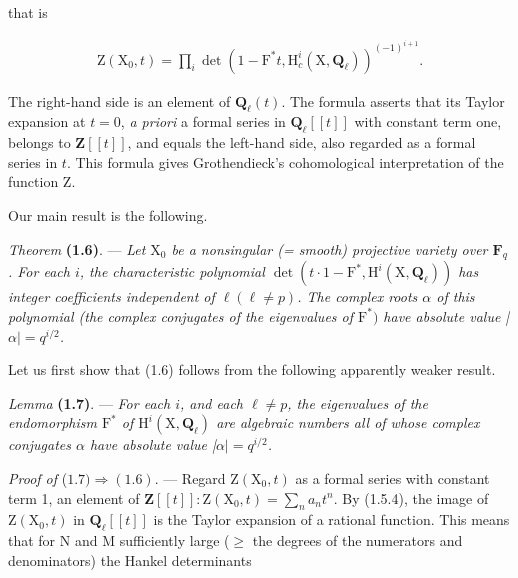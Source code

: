 \documentclass[10pt,leqno]{article}
\begin{document}
\noindent that is\par

\begin{equation*}\begin{gathered}\mathrm{Z}(\mathrm{X}_{0},t) = \prod _{i} \operatorname{det}(1- \mathrm{F}^{*}t, \mathrm{H}_{c}^{i}(\mathrm{X},\mathbf{Q}_{\ell }))^{(- 1)^{i+1}}.\end{gathered}\tag{1.5.4}\end{equation*}

\noindent The right-hand side is an element of \(\mathbf{Q}_{\ell }(t)\). The formula asserts that its Taylor expansion at \(t=0\), \emph{a priori} a formal series in \(\mathbf{Q}_{\ell }[[t]]\) with constant term one, belongs to \(\mathbf{Z}[[t]]\), and equals the left-hand side, also regarded as a formal series in \(t\). This formula gives Grothendieck’s cohomological interpretation of the function \(\mathrm{Z}\).\par

\noindent Our main result is the following.\par

\noindent \emph{Theorem} \textbf{(1.6)}. — {\itshape Let \(\mathrm{X}_{0}\) be a nonsingular (= smooth) projective variety over \(\mathbf{F}_{q}\). For each \(i\), the characteristic polynomial \(\operatorname{det}(t\cdot 1- \mathrm{F}^{*}, \mathrm{H}^{i}(\mathrm{X},\mathbf{Q}_{\ell }))\) has integer coefficients independent of \(\ell  (\ell \ne p)\). The complex roots \(\alpha \) of this polynomial (the complex conjugates of the eigenvalues of \(\mathrm{F}^{*})\) have absolute value |\(\alpha |=q^{i/2}\).}\par

\noindent Let us first show that (1.6) follows from the following apparently weaker result.\par

\noindent \emph{Lemma} \textbf{(1.7)}. — {\itshape For each \(i\), and each \(\ell \ne p\), the eigenvalues of the endomorphism \(\mathrm{F}^{*}\) of \(\mathrm{H}^{i}(\mathrm{X},\mathbf{Q}_{\ell })\) are algebraic numbers all of whose complex conjugates \(\alpha \) have absolute value |\(\alpha |=q^{i/2}\).}\par

\noindent \emph{Proof of} (\(1.7) \Rightarrow  (1.6)\). — Regard \(\mathrm{Z}(\mathrm{X}_{0},t)\) as a formal series with constant term 1, an element of \(\mathbf{Z}[[t]] : \mathrm{Z}(\mathrm{X}_{0},t)=\sum _{n} a_{n} t^{n}\). By (1.5.4), the image of \(\mathrm{Z}(\mathrm{X}_{0},t)\) in \(\mathbf{Q}_{\ell }[[t]]\) is the Taylor expansion of a rational function. This means that for \(\mathrm{N}\) and \(\mathrm{M}\) sufficiently large (\(\geq \) the degrees of the numerators and denominators) the Hankel determinants\par
\end{document}
